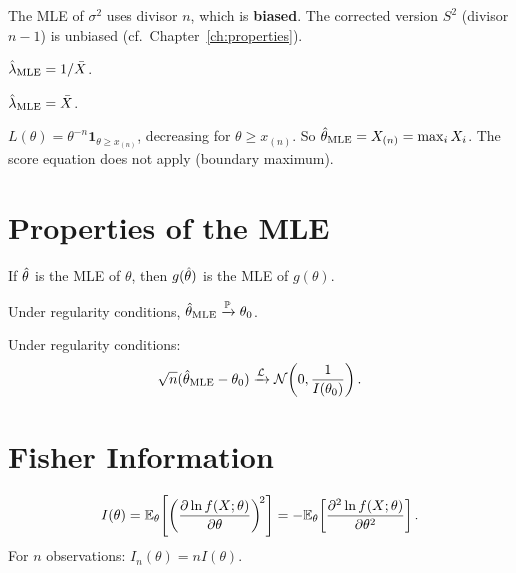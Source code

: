 \begin{warning}
The MLE of $\sigma^2$ uses divisor $n$, which is \textbf{biased}. The corrected version $S^2$ (divisor $n-1$) is unbiased (cf.\ Chapter~\ref{ch:properties}).
\end{warning}

\begin{example}[Exponential]
$\hat{\lambda}_{\mathrm{MLE}}=1/\bar{X}$.
\end{example}

\begin{example}[Poisson]
$\hat{\lambda}_{\mathrm{MLE}}=\bar{X}$.
\end{example}

\begin{example}
$L(\theta)=\theta^{-n}\mathbf{1}_{\theta\geq x_{(n)}}$, decreasing for $\theta\geq x_{(n)}$. So $\hat{\theta}_{\mathrm{MLE}}=X_{(n)}=\max_i X_i$. The score equation does not apply (boundary maximum).
\end{example}

\section{Properties of the MLE}

\begin{theorem}[Invariance]
If $\hat{\theta}$ is the MLE of $\theta$, then $g(\hat{\theta})$ is the MLE of $g(\theta)$.
\end{theorem}

\begin{theorem}[Consistency]
Under regularity conditions, $\hat{\theta}_{\mathrm{MLE}} \xrightarrow{\mathbb{P}} \theta_0$.
\end{theorem}

\begin{theorem}
\label{thm:mle-normality}
Under regularity conditions:
\[
\sqrt{n}(\hat{\theta}_{\mathrm{MLE}}-\theta_0) \xrightarrow{\mathcal{L}} \mathcal{N}\!\left(0, \frac{1}{I(\theta_0)}\right).
\]
\end{theorem}

\section{Fisher Information}

\begin{definition}
\[
I(\theta) = \mathbb{E}_\theta\!\left[\left(\frac{\partial \ln f(X;\theta)}{\partial\theta}\right)^{\!2}\right] = -\mathbb{E}_\theta\!\left[\frac{\partial^2 \ln f(X;\theta)}{\partial\theta^2}\right].
\]
For $n$ observations: $I_n(\theta)=nI(\theta)$.
\end{definition}

